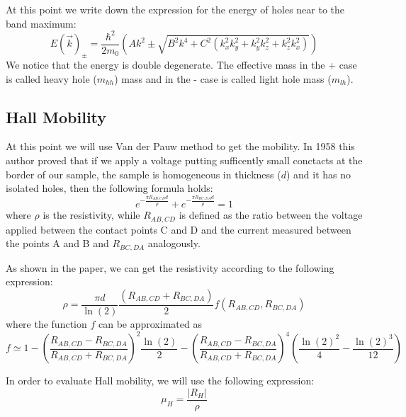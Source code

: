 \documentclass[11pt,a4paper]{article}
\begin{document}
At this point we write down the expression for the energy of holes near to the band maximum:
\begin{equation}
E(\vec{k})_\pm=\frac{\hbar^2}{2m_0}\left(Ak^2\pm\sqrt{B^2k^4+C^2(k_x^2k_y^2+k_y^2k_z^2+k_z^2k_x^2)}\right)
\end{equation}
We notice that the energy is double degenerate. The effective mass in the + case is called heavy hole ($m_{hh}$) mass and in the - case is called light hole mass ($m_{lh}$).

\subsection{Hall Mobility}
At this point we will use Van der Pauw method to get the mobility. In 1958 this author \cite{vdP} proved that if we apply a voltage putting sufficently small conctacts at the border of our sample, the sample is homogeneous in thickness ($d$) and it has no isolated holes, then the following formula holds:
\begin{equation}
e^{-\frac{\pi R_{AB,CD}d}{\rho}}+e^{-\frac{\pi R_{BC,DA}d}{\rho}}=1
\end{equation}
where $\rho$ is the resistivity, while $R_{AB,CD}$ is defined as the ratio between the voltage applied between the contact points C and D and the current measured between the points A and B and $R_{BC,DA}$ analogously.

As shown in the paper, we can get the resistivity according to the following expression:
\begin{equation}
\rho=\frac{\pi d}{\ln(2)}\frac{(R_{AB,CD}+R_{BC,DA})}{2}f\left(R_{AB,CD},R_{BC,DA}\right)
\end{equation}
where the function $f$ can be approximated as
\begin{equation}
f \simeq 1-\left(\frac{R_{AB,CD}-R_{BC,DA}}{R_{AB,CD}+R_{BC,DA}}\right)^2 \frac{\ln(2)}{2}-\left(\frac{R_{AB,CD}-R_{BC,DA}}{R_{AB,CD}+R_{BC,DA}}\right)^4\left(\frac{\ln(2)^2}{4}-\frac{\ln(2)^3}{12}\right)
\end{equation}

In order to evaluate Hall mobility, we will use the following expression:
\begin{equation}
\mu_H=\frac{|R_H|}{\rho}
\end{equation}
\end{document}
